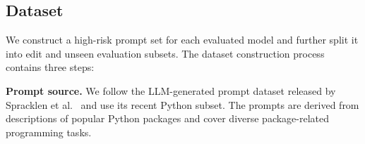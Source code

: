 \subsection{Dataset}
\label{sec:dataset}
We construct a high-risk prompt set for each evaluated model and further split it into edit and unseen evaluation subsets. The dataset construction process contains three steps:


\noindent{} \textbf{Prompt source.}
We follow the LLM-generated prompt dataset released by Spracklen et al.~\cite{spracklen2025we} and use its recent Python subset. 
The prompts are derived from descriptions of popular Python packages and cover diverse package-related programming tasks.


